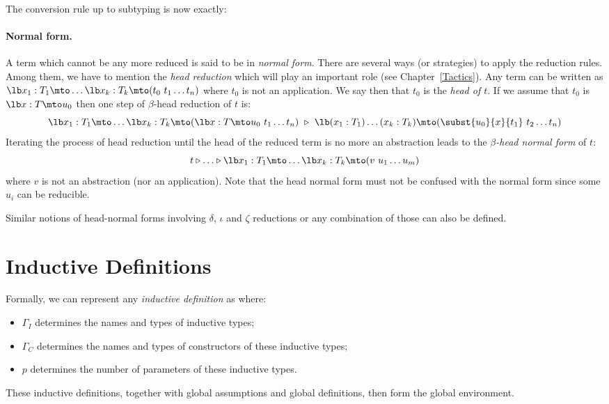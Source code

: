 The conversion rule up to subtyping is now exactly:

\begin{description}\label{Conv}
\item[Conv]
  \end{description}


\paragraph[Normal form.]{Normal form.\label{Normal-form}\label{Head-normal-form}}
A term which cannot be any more reduced is said to be in {\em normal
  form}. There are several ways (or strategies) to apply the reduction
rules. Among them, we have to mention the {\em head reduction} which
will play an important role (see Chapter~\ref{Tactics}). Any term can
be written as $\lb x_1:T_1\mto \ldots \lb x_k:T_k \mto
(t_0\ t_1\ldots t_n)$ where
$t_0$ is not an application. We say then that $t_0$ is the {\em head
  of $t$}. If we assume that $t_0$ is $\lb x:T\mto u_0$ then one step of
$\beta$-head reduction of $t$ is:
\[\lb x_1:T_1\mto \ldots \lb x_k:T_k\mto (\lb x:T\mto u_0\ t_1\ldots t_n)
~\triangleright ~ \lb (x_1:T_1)\ldots(x_k:T_k)\mto
(\subst{u_0}{x}{t_1}\ t_2 \ldots t_n)\]
Iterating the process of head reduction until the head of the reduced
term is no more an abstraction leads to the {\em $\beta$-head normal
  form} of $t$:
\[ t \triangleright \ldots \triangleright
\lb x_1:T_1\mto \ldots\lb x_k:T_k\mto (v\ u_1
\ldots u_m)\]
where $v$ is not an abstraction (nor an application).  Note that the
head normal form must not be confused with the normal form since some
$u_i$ can be reducible.

Similar notions of head-normal forms involving $\delta$, $\iota$ and $\zeta$
reductions or any combination of those can also be defined.

\section[Inductive definitions]{Inductive Definitions\label{Cic-inductive-definitions}}


Formally, we can represent any {\em inductive definition} as  where:
\begin{itemize}
  \item $\Gamma_I$ determines the names and types of inductive types;
  \item $\Gamma_C$ determines the names and types of constructors of these inductive types;
  \item $p$ determines the number of parameters of these inductive types.
\end{itemize}
These inductive definitions, together with global assumptions and global definitions, then form the global environment.

